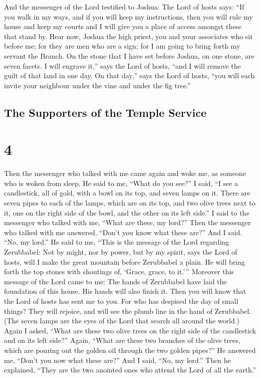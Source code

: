  And the messenger of the Lord testified to Joshua:
 The Lord of hosts says: ``If you walk in my ways, and if
you will keep my instructions, then you will rule my house and keep my
courts and I will give you a place of access amongst these that stand
by.  Hear now, Joshua the high priest, you and your
associates who sit before me; for they are men who are a sign; for I am
going to bring forth my servant the Branch.  On the stone
that I have set before Joshua, on one stone, are seven facets. I will
engrave it,'' says the Lord of hosts, ``and I will remove the guilt of
that land in one day.  On that day,'' says the Lord of
hosts, ``you will each invite your neighbour under the vine and under
the fig tree.''

\hypertarget{the-supporters-of-the-temple-service}{%
\subsection{The Supporters of the Temple
Service}\label{the-supporters-of-the-temple-service}}

\hypertarget{section-3}{%
\section{4}\label{section-3}}

 Then the messenger who talked with me came again and woke
me, as someone who is woken from sleep.  He said to me,
``What do you see?'' I said, ``I see a candlestick, all of gold, with a
bowl on its top, and seven lamps on it. There are seven pipes to each of
the lamps, which are on its top,  and two olive trees next
to it, one on the right side of the bowl, and the other on its left
side.''  I said to the messenger who talked with me, ``What
are these, my lord?''  Then the messenger who talked with me
answered, ``Don't you know what these are?'' And I said. ``No, my
lord.''  He said to me, ``This is the message of the Lord
regarding Zerubbabel: Not by might, nor by power, but by my spirit, says
the Lord of hosts,  will I make the great mountain before
Zerubbabel a plain. He will bring forth the top stones with shoutings
of, `Grace, grace, to it.'\,''  Moreover this message of the
Lord came to me:  The hands of Zerubbabel have laid the
foundation of this house. His hands will also finish it. Then you will
know that the Lord of hosts has sent me to you.  For who
has despised the day of small things? They will rejoice, and will see
the plumb line in the hand of Zerubbabel. (The seven lamps are the eyes
of the Lord that search all around the world.)  Again I
asked, ``What are these two olive trees on the right side of the
candlestick and on its left side?''  Again, ``What are
these two branches of the olive trees, which are pouring out the golden
oil through the two golden pipes?''  He answered me,
``Don't you now what these are?'' And I said, ``No, my lord.''
 Then he explained, ``They are the two anointed ones who
attend the Lord of all the earth.''

